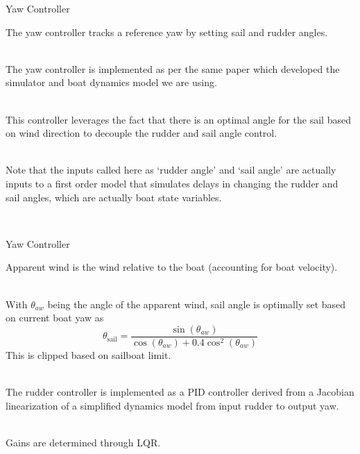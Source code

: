 \documentclass[10pt,xcolor={table,dvipsnames},t]{beamer}
\begin{document}
\begin{frame}{Yaw Controller}

    The yaw controller tracks a reference yaw by setting sail and rudder angles.

    \hfill\\
    The yaw controller is implemented as per the same paper which developed the simulator and 
    boat dynamics model we are using\cite{Buehler2018}.
    
    \hfill\\
    This controller leverages the fact that there is an optimal angle for the sail based on wind direction to decouple the rudder and sail angle control.
    
    \hfill\\
    Note that the inputs called here as `rudder angle' and `sail angle' are actually
    inputs to a first order model that simulates delays in changing the rudder and sail angles,
    which are actually boat state variables.
    
    \hfill\\
    
    
\end{frame}

\begin{frame}{Yaw Controller}

    Apparent wind is the wind relative to the boat (accounting for boat velocity).
    
    \hfill\\
    With \(\theta_{aw}\) being the angle of the apparent wind, sail angle is optimally set based on current boat yaw as 
    \begin{equation}
        \theta_{\text{sail}} = \frac{\sin(\theta_{aw})}{\cos(\theta_{aw}) + 0.4\cos^2(\theta_{aw})}
    \end{equation}
    This is clipped based on sailboat limit.

    \hfill\\
    The rudder controller is implemented as a PID controller derived from a Jacobian linearization of a simplified dynamics model from input rudder to output yaw.
    
    \hfill\\
    Gains are determined through LQR.
    
\end{frame}
\end{document}
